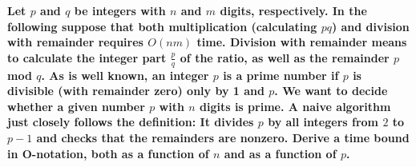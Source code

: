 \documentclass[12pt,oneside,reqno]{amsart}
\begin{document}
\textbf{Let $p$ and $q$ be integers with $n$ and $m$ digits, respectively. In the following
suppose that both multiplication (calculating $pq$) and division with remainder
requires $O(nm)$ time. Division with remainder means to calculate the
integer part $\frac{p}{q}$ of the ratio, as well as the remainder $p$ mod $q$.
As is well known, an integer $p$ is a prime number if $p$ is divisible (with
remainder zero) only by 1 and $p$. We want to decide whether a given number
$p$ with $n$ digits is prime. A naive algorithm just closely follows the definition:
It divides $p$ by all integers from $2$ to $p−1$ and checks that the remainders
are nonzero. Derive a time bound in O-notation, both as a function of $n$
and as a function of $p$.}\\
\end{document}
